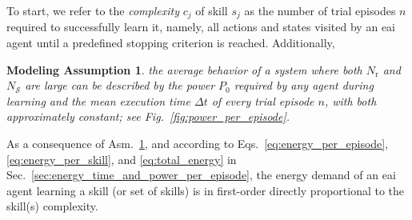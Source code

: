 \documentclass[12pt]{article}
\renewcommand{\emph}[1]{\textit{#1}}
\newtheorem{assumption}{Modeling Assumption}
\begin{document}
To start, we refer to the \emph{complexity} $c_j$ of skill $ s_j $ as the number of trial episodes $n$ required to successfully learn it, namely, all actions and states visited by an \ac{eai} agent until a predefined stopping criterion is reached. Additionally,
\begin{tcolorbox}
	\begin{assumption}\label{assumption:power_and_episode_time}
		the average behavior of a system where both $N_\mathrm{r}$ and $N_\mathcal{S}$ are large can be described by the power $P_0$ required by any agent during learning and the mean execution time $\Delta t$ of every trial episode $n$, with both approximately constant; see Fig.~\ref{fig:power_per_episode}.
	\end{assumption}
\end{tcolorbox}
\noindent As a consequence of Asm.~\ref{assumption:power_and_episode_time}, and according to Eqs.~\eqref{eq:energy_per_episode},\eqref{eq:energy_per_skill}, and \eqref{eq:total_energy} in Sec.~\ref{sec:energy_time_and_power_per_episode}, the energy demand of an \ac{eai} agent learning a skill (or set of skills) is in first-order directly proportional to the skill(s) complexity.
\end{document}
